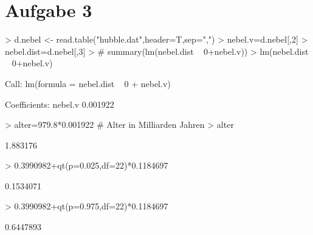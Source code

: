 
\section{Aufgabe 3}
\begin{Schunk}
\begin{Sinput}
> d.nebel <- read.table("hubble.dat",header=T,sep=",")
> nebel.v=d.nebel[,2]
> nebel.dist=d.nebel[,3]
> # summary(lm(nebel.dist ~ 0+nebel.v))
> lm(nebel.dist ~ 0+nebel.v)
\end{Sinput}
\begin{Soutput}
Call:
lm(formula = nebel.dist ~ 0 + nebel.v)

Coefficients:
 nebel.v  
0.001922  
\end{Soutput}
\begin{Sinput}
> alter=979.8*0.001922 # Alter in Milliarden Jahren
> alter
\end{Sinput}
\begin{Soutput}
[1] 1.883176
\end{Soutput}
\begin{Sinput}
> 0.3990982+qt(p=0.025,df=22)*0.1184697
\end{Sinput}
\begin{Soutput}
[1] 0.1534071
\end{Soutput}
\begin{Sinput}
> 0.3990982+qt(p=0.975,df=22)*0.1184697
\end{Sinput}
\begin{Soutput}
[1] 0.6447893
\end{Soutput}
\end{Schunk}
